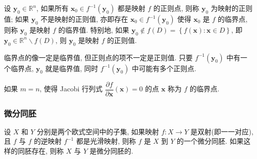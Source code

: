 \begin{definition}
设 $\boldsymbol{y}_0\in\mathbb{R}^n$, 如果所有 $\boldsymbol{x}_0\in f^{-1}\left(\boldsymbol{y}_0\right)$ 都是映射 $f$ 的正则点, 则称 $\boldsymbol{y}_0$ 为映射的正则值; 如果 $\boldsymbol{y}_0$ 不是映射的正则值, 亦即存在 $\boldsymbol{x}_0\in f^{-1}\left(\boldsymbol{y}_0\right)$ 使得 $\boldsymbol{x}_0$ 是 $f$ 的临界点, 则称 $\boldsymbol{y}_0$ 是映射 $f$ 的临界值. 特别地, 如果 $\boldsymbol{y}_0\notin f(D)=\left\lbrace f(\boldsymbol{x}): \boldsymbol{x}\in D\right\rbrace$, 即 $\boldsymbol{y}_0\in\mathbb{R}^n\backslash f(D)$, 则 $\boldsymbol{y}_0$ 是映射 $f$ 的正则值.
\end{definition}

临界点的像一定是临界值, 但正则点的项不一定是正则值. 只要 $f^{-1}\left(\boldsymbol{y}_0\right)$ 中有一个临界点, $\boldsymbol{y}_0$ 就是临界值, 同时 $f^{-1}\left(\boldsymbol{y}_0\right)$ 中可能有多个正则点.

如果 $m=n$, 使得 Jacobi 行列式 $\dfrac{\partial f}{\partial \boldsymbol{x}}\left(\boldsymbol{x}\right)=0$ 的点 $\boldsymbol{x}$ 称为 $f$ 的临界点.

\subsubsection{微分同胚}

\begin{definition}
设 $X$ 和 $Y$ 分别是两个欧式空间中的子集, 如果映射 $f:X\to Y$ 是双射(即一一对应), 且 $f$ 与 $f$ 的逆映射 $f^{-1}$ 都是光滑映射, 则称 $f$ 是 $X$ 到 $Y$ 的一个微分同胚. 如果这样的同胚存在, 则称 $X$ 与 $Y$ 是微分同胚的.
\end{definition}

